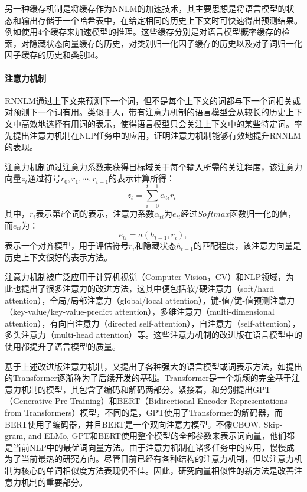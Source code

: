 \documentclass[a4paper, 12pt, twocolumn]{article}
\begin{document}
另一种缓存机制是将缓存作为NNLM的加速技术，其主要思想是将语言模型的状态和输出存储于一个哈希表中，在给定相同的历史上下文时可快速得出预测结果。例如\cite{huang2014cache}使用4个缓存来加速模型的推理。这些缓存分别是对语言模型概率缓存的检索，对隐藏状态向量缓存的历史，对类别归一化因子缓存的历史以及对子词归一化因子缓存的历史和类别Id。

\paragraph{注意力机制}
RNNLM通过上下文来预测下一个词，但不是每个上下文的词都与下一个词相关或对预测下一个词有用。类似于人，带有注意力机制的语言模型会从较长的历史上下文中高效地选择有用词的表示，使得语言模型只会关注上下文中的某些特定词。\cite{bahdanau2014neural}率先提出注意力机制在NLP任务中的应用，\cite{tran2016recurrent,mei2017coherent}证明注意力机制能够有效地提升RNNLM的表现。

注意力机制通过注意力系数来获得目标域关于每个输入所需的关注程度，该注意力向量$z_t$通过符号$r_0,r_1,\cdots,r_{t-1}$的表示计算所得：
\begin{equation}
  z_t=\sum_{i=0}^{t-1}\alpha_{ti}r_{i\cdot}
  \label{eq:7}
\end{equation}
其中，$r_i$表示第$i$个词的表示，注意力系数$\alpha _{ti}$为$e_{ti}$经过$Softmax$函数归一化的值，而$e_{ti}$为：
\begin{equation}
  e_{ti}=a\left(h_{t-1}, r_i\right),
\end{equation}
表示一个对齐模型，用于评估符号$r_i$和隐藏状态$h_{t-1}$的匹配程度，该注意力向量是历史上下文很好的表示方法。

注意力机制被广泛应用于计算机视觉（Computer Vision，CV）和NLP领域，为此也提出了很多注意力的改进方法，这其中便包括软/硬注意力（soft/hard attention），全局/局部注意力（global/local attention），键-值/键-值预测注意力（key-value/key-value-predict attention），多维注意力（multi-dimensional attention），有向自注意力（directed self-attention），自注意力（self-attention），多头注意力（multi-head attention）等。这些注意力机制的改进版在语言模型中的使用都提升了语言模型的质量。

基于上述改进版注意力机制，又提出了各种强大的语言模型或词表示方法，如\cite{vaswani2017attention}提出的Transformer逐渐称为了后续开发的基础。Transformer是一个新颖的完全基于注意力机制的模型，其包含了编码和解码两部分。紧接着，\cite{radford2018improving}和\cite{devlin2018bert}分别提出GPT（Generative Pre-Training）和BERT（Bidirectional Encoder Representations from Transformers）模型，不同的是，GPT使用了Transformer的解码器，而BERT使用了编码器，并且BERT是一个双向注意力模型。不像CBOW, Skip-gram, and ELMo, GPT和BERT使用整个模型的全部参数来表示词向量，他们都是当前NLP中的最优词向量方法。由于注意力机制在诸多任务中的应用，慢慢成为了当前最热的研究方向。尽管目前已经有各种结构的注意力机制，但以注意力机制为核心的单词相似度方法表现仍不佳。因此，研究向量相似性的新方法是改善注意力机制的重要部分。
\end{document}
